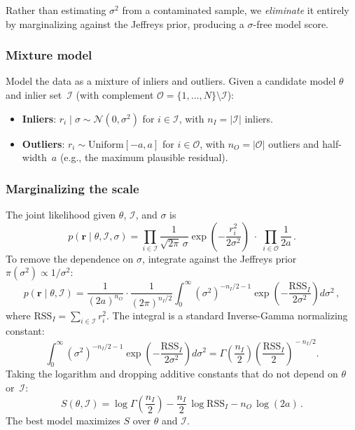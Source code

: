 \documentclass[11pt]{article}
\newcommand{\Normal}{\mathcal{N}}
\begin{document}
Rather than estimating $\sigma^2$ from a contaminated sample, we
\emph{eliminate} it entirely by marginalizing against the Jeffreys prior,
producing a $\sigma$-free model score.

\subsubsection{Mixture model}

Model the data as a mixture of inliers and outliers.  Given a candidate
model $\theta$ and inlier set~$\mathcal{I}$ (with complement
$\mathcal{O} = \{1, \ldots, N\} \setminus \mathcal{I}$):
\begin{itemize}
  \item \textbf{Inliers}: $r_i \mid \sigma \sim \Normal(0, \sigma^2)$
    for $i \in \mathcal{I}$, with $n_I = |\mathcal{I}|$ inliers.
  \item \textbf{Outliers}: $r_i \sim \mathrm{Uniform}[-a, a]$ for
    $i \in \mathcal{O}$, with $n_O = |\mathcal{O}|$ outliers and
    half-width~$a$ (e.g., the maximum plausible residual).
\end{itemize}

\subsubsection{Marginalizing the scale}

The joint likelihood given $\theta$, $\mathcal{I}$, and $\sigma$ is
\begin{equation}
  p(\mathbf{r} \mid \theta, \mathcal{I}, \sigma)
  = \prod_{i \in \mathcal{I}}
    \frac{1}{\sqrt{2\pi}\,\sigma}
    \exp\!\left(-\frac{r_i^2}{2\sigma^2}\right)
  \;\cdot\; \prod_{i \in \mathcal{O}} \frac{1}{2a}\,.
\end{equation}
To remove the dependence on $\sigma$, integrate against the Jeffreys
prior $\pi(\sigma^2) \propto 1/\sigma^2$:
\begin{equation}
  p(\mathbf{r} \mid \theta, \mathcal{I})
  = \frac{1}{(2a)^{n_O}}
    \cdot \frac{1}{(2\pi)^{n_I/2}}
    \int_0^\infty
      (\sigma^2)^{-n_I/2 - 1}
      \exp\!\left(-\frac{\mathrm{RSS}_I}{2\sigma^2}\right)
      d\sigma^2\,,
\end{equation}
where $\mathrm{RSS}_I = \sum_{i \in \mathcal{I}} r_i^2$.
The integral is a standard Inverse-Gamma normalizing constant:
\begin{equation}
  \int_0^\infty
    (\sigma^2)^{-n_I/2 - 1}
    \exp\!\left(-\frac{\mathrm{RSS}_I}{2\sigma^2}\right)
    d\sigma^2
  = \Gamma\!\left(\frac{n_I}{2}\right)
    \left(\frac{\mathrm{RSS}_I}{2}\right)^{\!-n_I/2}.
\end{equation}
Taking the logarithm and dropping additive constants that do not depend
on $\theta$ or~$\mathcal{I}$:
\begin{equation}
  \boxed{
    S(\theta, \mathcal{I})
    = \log\Gamma\!\left(\frac{n_I}{2}\right)
      - \frac{n_I}{2}\,\log \mathrm{RSS}_I
      - n_O\, \log(2a)\,.
  }
\end{equation}
The best model maximizes $S$ over $\theta$ and $\mathcal{I}$.
\end{document}
